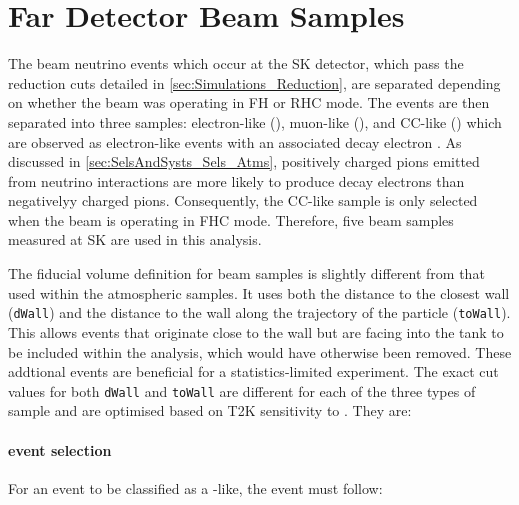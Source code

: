 \section{Far Detector Beam Samples}
\label{sec:SelsAndSysts_Sels_FD}

The beam neutrino events which occur at the SK detector, which pass the reduction cuts detailed in \autoref{sec:Simulations_Reduction}, are separated depending on whether the beam was operating in FH or RHC mode. The events are then separated into three samples: electron-like (), muon-like (), and CC\quickmath{1\pi^{+}}-like () which are observed as electron-like events with an associated decay electron \cite{t2k_tn_399}. As discussed in \autoref{sec:SelsAndSysts_Sels_Atms}, positively charged pions emitted from neutrino interactions are more likely to produce decay electrons than negativelyy charged pions. Consequently, the CC\quickmath{1\pi^{+}}-like sample is only selected when the beam is operating in FHC mode. Therefore, five beam samples measured at SK are used in this analysis.

The fiducial volume definition for beam samples is slightly different from that used within the atmospheric samples.  It uses both the distance to the closest wall (\texttt{dWall}) and the distance to the wall along the trajectory of the particle (\texttt{toWall}). This allows events that originate close to the wall but are facing into the tank to be included within the analysis, which would have otherwise been removed. These addtional events are beneficial for a statistics-limited experiment. The exact cut values for both \texttt{dWall} and \texttt{toWall} are different for each of the three types of sample and are optimised based on T2K sensitivity to \dcp \cite{t2k_tn_318, t2k_tn_319}. They are:


\paragraph{ event selection}

For an event to be classified as a -like, the event must follow:

